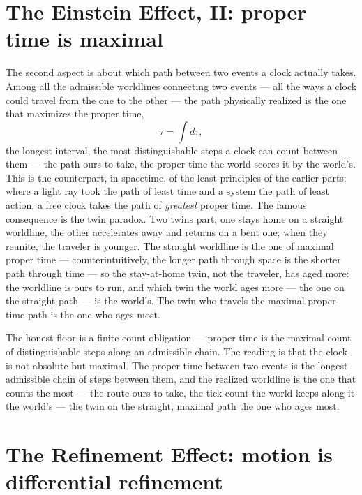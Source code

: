 \section{The Einstein Effect, II: proper time is maximal}
\label{se:einstein-proper-time}

The second aspect is about which path between two events a clock actually takes. Among all the admissible
worldlines connecting two events --- all the ways a clock could travel from the one to the other --- the path
physically realized is the one that maximizes the proper time,
\begin{equation}
  \tau = \int d\tau,
\end{equation}
the longest interval, the most distinguishable steps a clock can count between them --- the path ours to take,
the proper time the world scores it by the world's. This is the counterpart,
in spacetime, of the least-principles of the earlier parts: where a light ray took the path of least time and a
system the path of least action, a free clock takes the path of \emph{greatest} proper time. The famous
consequence is the twin paradox. Two twins part; one stays home on a straight worldline, the other accelerates
away and returns on a bent one; when they reunite, the traveler is younger. The straight worldline is the one
of maximal proper time --- counterintuitively, the longer path through space is the shorter path through time
--- so the stay-at-home twin, not the traveler, has aged more: the worldline is ours to run, and which twin the
world ages more --- the one on the straight path --- is the world's. The twin who travels the maximal-proper-time
path is the one who ages most.

The honest floor is a finite count obligation --- proper time is the maximal count of distinguishable steps
along an admissible chain. The reading is that the clock is not absolute but maximal. The proper time between
two events is the longest admissible chain of steps between them, and the realized worldline is the one that
counts the most --- the route ours to take, the tick-count the world keeps along it the world's --- the twin on
the straight, maximal path the one who ages most.

\section{The Refinement Effect: motion is differential refinement}
\label{se:refinement}


